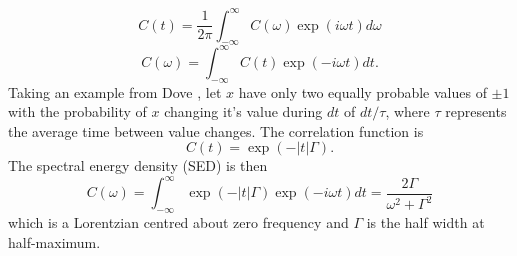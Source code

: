 %
\begin{equation}
C(t)=\frac{1}{2\pi}\int_{-\infty}^{\infty}C(\omega)\exp(i\omega t)d\omega
\end{equation}
%
\begin{equation}
C(\omega)=\int_{-\infty}^{\infty}C(t) \exp(-i\omega t) dt.
\end{equation}
%
Taking an example from Dove \cite{dove_introduction_1993-3}, let $x$ have only two equally probable values of $\pm 1$ with the probability of $x$ changing it's value during $dt$ of $dt/\tau$, where $\tau$ represents the average time between value changes. The correlation function is
%
\begin{equation}
C(t)=\exp\left (-|t|\Gamma \right ).
\end{equation}
%
The spectral energy density (SED) is then
\begin{equation}\label{EQ:lorentzian_1}
C(\omega)=\int_{-\infty}^{\infty}\exp\left (-|t|\Gamma \right ) \exp(-i\omega t)dt=\frac{2\Gamma}{\omega^2 +\Gamma^2}
\end{equation}
which is a Lorentzian centred about zero frequency and $\Gamma$ is the half width at half-maximum.%

